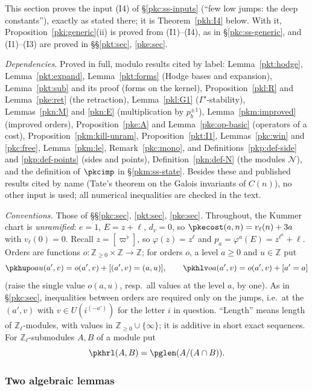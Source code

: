 \documentclass[10pt]{amsart}
\theoremstyle{definition}
\theoremstyle{remark}
\newcommand{\Z}{\mathbb Z}
\begin{document}
This section proves the input (I4) of \S\ref{pkc:ss-inputs} (``few low jumps: the deep constants''),
exactly as stated there; it is Theorem~\ref{pkh:I4} below. With it, Proposition~\ref{pki:generic}(ii)
is proved from (I1)--(I4), as in \S\ref{pkc:ss-generic}, and (I1)--(I3) are proved in
\S\S\ref{pkt:sec}, \ref{pke:sec}.

\emph{Dependencies.} Proved in full, modulo results cited by label: Lemma~\ref{pkt:hodge},
Lemma~\ref{pkt:expand}, Lemma~\ref{pkt:forms} (Hodge bases and expansion), Lemma~\ref{pkt:sub} and its
proof (forms on the kernel), Proposition~\ref{pkl:R} and Lemma~\ref{pke:ret} (the retraction),
Lemma~\ref{pkl:G1} ($\Gamma'$-stability), Lemmas~\ref{pkn:M} and \ref{pkn:E} (multiplication by $p_b^{\pm1}$),
Lemma~\ref{pkm:improved} (improved orders), Proposition~\ref{pke:A} and Lemma~\ref{pke:op-basic}
(operators of a cost), Proposition~\ref{pkm:kill-unram}, Proposition~\ref{pkt:I1}, Lemmas~\ref{pkc:win} and
\ref{pkc:free}, Lemma~\ref{pkm:le}, Remark~\ref{pkc:mono}, and Definitions~\ref{pkp:def-side} and
\ref{pkp:def-points} (sides and points), Definition~\ref{pkn:def-N} (the modules $\mathcal N$), and the
definition of $\pkcimp$ in \S\ref{pkm:ss-state}. Besides these and published results cited by name (Tate's
theorem on the Galois invariants of $C(n)$), no other input is used; all numerical inequalities are checked in the text.

\emph{Conventions.} Those of \S\S\ref{pkc:sec}, \ref{pkt:sec}, \ref{pke:sec}. Throughout, the Kummer
chart is \emph{unramified}: $e=1$, $E=z+\ell$, $d_v=0$, so $\pkecost(a,n)=v_\ell(n)+3a$ with $v_\ell(0)=0$.
Recall $z=[\varpi^\flat]$, so $\varphi(z)=z^\ell$ and $p_a=\varphi^a(E)=z^{\ell^a}+\ell$. Orders are functions
$o\colon\Z_{\ge0}\times\Z\to\Z$; for orders $o$, a level $a\ge0$ and $u\in\Z$ put
\[
\pkhup oau(a',v)=o(a',v)+[(a',v)=(a,u)],\qquad \pkhlv oa(a',v)=o(a',v)+[a'=a]
\]
(raise the single value $o(a,u)$, resp.\ all values at the level $a$, by one). As in \S\ref{pkc:sec},
inequalities between orders are required only on the jumps, i.e.\ at the $(a',v)$ with $v\in
U(i^{(-a')})$ for the letter $i$ in question. ``Length'' means length of $\Z_\ell$-modules, with values in
$\Z_{\ge0}\cup\{\infty\}$; it is additive in short exact sequences. For $\Z_\ell$-submodules $A,B$ of a
module put
\[
\pkhrl(A,B)=\pglen(A/(A\cap B)).
\]

\subsubsection{Two algebraic lemmas}\label{pkh:ss-alg}
\end{document}
